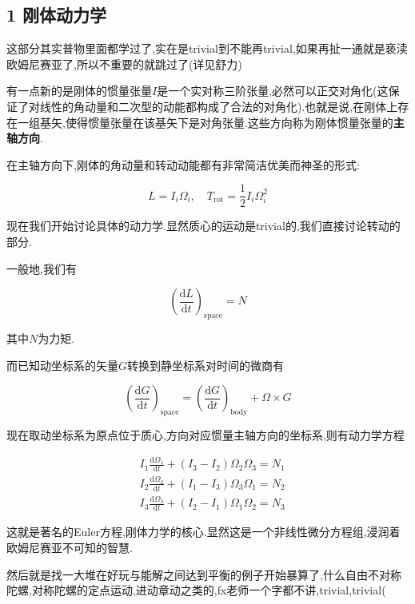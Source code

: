 \documentclass[UTF8]{article}
\newcommand{\D}{\mathrm{d}}
\begin{document}
	
	\newpage
	
	
	
\subsection*{1 刚体动力学}
	
	这部分其实普物里面都学过了,实在是trivial到不能再trivial,如果再扯一通就是亵渎欧姆尼赛亚了,所以不重要的就跳过了(详见舒力\cite{ShuYouSheng})
	
	有一点新的是刚体的惯量张量$I$是一个实对称三阶张量,必然可以正交对角化(这保证了对线性的角动量和二次型的动能都构成了合法的对角化).也就是说,在刚体上存在一组基矢,使得惯量张量在该基矢下是对角张量.这些方向称为刚体惯量张量的\textbf{主轴方向}.
	
	在主轴方向下,刚体的角动量和转动动能都有非常简洁优美而神圣的形式:
	
	\[L= I_i\Omega_i,\quad T_{\mathrm{rot}}=\frac{1}{2}I_i\Omega_i^2\]
	
	现在我们开始讨论具体的动力学.显然质心的运动是trivial的,我们直接讨论转动的部分.
	
	一般地,我们有
	
	\[\left(\frac{\D L}{\D t}\right)_{\mathrm{space}}=N\]
	
	其中$N$为力矩.
	
	而已知动坐标系的矢量$G$转换到静坐标系对时间的微商有
	
	\[\left(\frac{\D G}{\D t}\right)_{\mathrm{space}}=\left(\frac{\D G}{\D t}\right)_{\mathrm{body}}+\Omega\times G\]
	
	现在取动坐标系为原点位于质心,方向对应惯量主轴方向的坐标系,则有动力学方程
	
	\[
	\begin{aligned}
		&I_{1} \frac{\mathrm{d} \Omega_{1}}{\mathrm{d} t}+(I_{3}-I_{2}) \Omega_{2} \Omega_{3}=N_{1} \\
		&I_{2} \frac{\mathrm{d} \Omega_{2}}{\mathrm{d} t}+(I_{1}-I_{3}) \Omega_{3} \Omega_{1}=N_{2} \\
		&I_{3} \frac{\mathrm{d} \Omega_{3}}{\mathrm{d} t}+(I_{2}-I_{1}) \Omega_{1} \Omega_{2}=N_{3}
	\end{aligned}
	\]
	
	这就是著名的Euler方程,刚体力学的核心.显然这是一个非线性微分方程组,浸润着欧姆尼赛亚不可知的智慧.
	
	然后就是找一大堆在好玩与能解之间达到平衡的例子开始暴算了,什么自由不对称陀螺,对称陀螺的定点运动,进动章动之类的,fx老师一个字都不讲,trivial,trivial(
	
	\newpage
	
\end{document}
